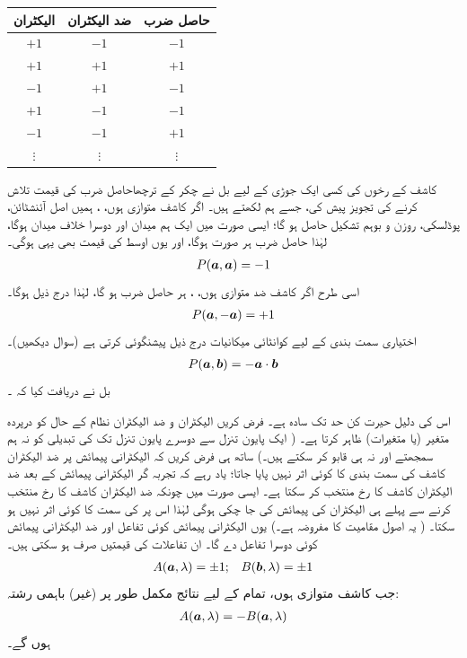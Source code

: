 \begin{center}
\begin{tabular}{c c c}
\toprule
الیکٹران & ضد الیکٹران &حاصل ضرب \\
\midrule
$+1$ & $-1$ & $-1$ \\
$+1$ & $+1$ & $+1$ \\
$-1$ & $+1$ & $-1$ \\
$+1$ & $-1$ & $-1$ \\
$-1$ & $-1$ & $+1$ \\
$\vdots$ & $\vdots$ & $\vdots$ \\
\bottomrule
\end{tabular}
\end{center}

کاشف کے رخوں کی کسی ایک جوڑی کے لیے بل نے چکر کے ترچھا{حاصل ضرب} کی  قیمت تلاش کرنے کی تجویز پیش کی، جسے ہم  لکھتے ہیں۔ اگر کاشف متوازی ہوں، ، ہمیں اصل آئنشٹائن، پوڈلسکی، روزن و بوہم تشکیل حاصل ہو گا؛ ایسی صورت میں ایک ہم میدان اور دوسرا خلاف میدان ہوگا، لہٰذا حاصل ضرب ہر صورت  ہوگا، اور یوں اوسط کی قیمت بھی یہی ہوگی۔
\begin{align}
	P({{\boldsymbol{a}}},{{\boldsymbol{a}}}) = -1
\end{align}
اسی طرح اگر کاشف ضد متوازی ہوں، ، ہر حاصل ضرب  ہو گا، لہٰذا درج ذیل ہوگا۔
\begin{align}
	P({{\boldsymbol{a}}}, -{{\boldsymbol{a}}}) = +1
\end{align}
اختیاری سمت بندی کے لیے کوانٹائی میکانیات درج ذیل پیشنگوئی کرتی ہے (سوال  دیکھیں)۔
\begin{align}\label{مساوات_پس_پیشنگوئی}
	P({{\boldsymbol{a}}}, {{\boldsymbol{b}}}) = -{{\boldsymbol{a}}}\cdot {\ensuremath{{\boldsymbol{b}}}}
\end{align}
 بل نے دریافت کیا کہ ۔

اس کی دلیل حیرت کن حد تک سادہ ہے۔ فرض کریں الیکٹران و ضد الیکٹران نظام کے  حال کو درپردہ متغیر (یا متغیرات)  ظاہر کرتا ہے۔ ( ایک پایون تنزل سے دوسرے پایون تنزل تک  کی تبدیلی کو نہ ہم سمجھتے اور نہ ہی قابو کر سکتے ہیں۔) ساتھ ہی فرض کریں کہ الیکٹرانی پیمائش پر ضد الیکٹران کاشف کی سمت بندی  کا کوئی اثر نہیں پایا جاتا؛ یاد رہے کہ تجربہ گر الیکٹرانی پیمائش کے بعد ضد الیکٹران کاشف کا رخ منتخب کر سکتا ہے۔ ایسی صورت میں چونکہ ضد الیکٹران کاشف کا رخ منتخب کرنے سے پہلے ہی الیکٹران کی پیمائش کی جا چکی ہوگی لہٰذا اس پر  کی سمت کا کوئی اثر نہیں ہو سکتا۔ ( یہ اصول مقامیت کا مفروضہ ہے۔) یوں الیکٹرانی پیمائش کوئی تفاعل  اور ضد الیکٹرانی پیمائش کوئی دوسرا تفاعل  دے گا۔ ان تفاعلات کی قیمتیں صرف  ہو سکتی ہیں۔
\begin{align}\label{مساوات_پس_دو_رشتے}
	A({{\boldsymbol{a}}}, \lambda) = \pm1; && B({{\boldsymbol{b}}}, \lambda) = \pm 1
\end{align}
جب کاشف متوازی ہوں، تمام  کے لیے نتائج مکمل طور پر (غیر) باہمی رشتہ:
\begin{align}\label{مساوات_پس_غیر_باہمی_رشتہ}
	A({{\boldsymbol{a}}}, \lambda) = -B({{\boldsymbol{a}}}, \lambda)
\end{align}
ہوں گے۔

